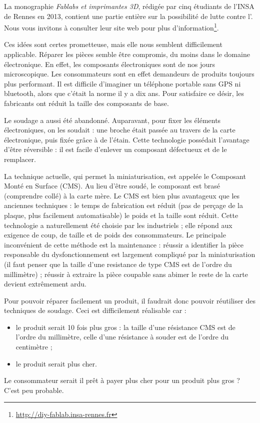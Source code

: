 La monographie \textit{Fablabs et imprimantes 3D}, rédigée par cinq étudiants de l'INSA de Rennes en 2013, contient une partie entière sur la possibilité de lutte contre l'\op. Nous vous invitons à consulter leur site web pour plus d'information\footnote{\url{http://diy-fablab.insa-rennes.fr}}.


\bigbreak 

Ces idées sont certes prometteuse, mais elle nous semblent difficilement applicable. Réparer les pièces semble  être compromis, du moins dans le domaine électronique. En effet, les composants électroniques sont de nos jours microscopique. Les consommateurs sont en effet demandeurs de produits toujours plus performant. Il est difficile d'imaginer un téléphone portable sans GPS ni bluetooth, alors que c'était la norme il y a dix ans. Pour satisfaire ce désir, les fabricants ont réduit la taille des composants de base. 

Le soudage a aussi été abandonné. Auparavant, pour fixer les éléments électroniques, on les soudait : une broche était passée au travers de la carte électronique, puis fixée grâce à de l'étain. Cette technologie possédait l'avantage d'être réversible : il est facile d'enlever un composant défectueux et de le remplacer. 

La technique actuelle, qui permet la miniaturisation, est appelée le Composant Monté en Surface (CMS). Au lieu d'être soudé, le composant est brasé (comprendre collé) à la carte mère. Le CMS est bien plus avantageux que les anciennes techniques : le temps de fabrication est réduit (pas de perçage de la plaque, plus facilement automatisable) le poids et la taille  sont réduit. Cette technologie a naturellement été choisie par les industriels ; elle répond aux exigence de coup, de taille et de poids des consommateurs. Le principale inconvénient de cette méthode est la maintenance : réussir a identifier la pièce responsable du dysfonctionnement est largement compliqué par la miniaturisation (il faut penser que la taille d'une resistance de type CMS est de  l'ordre du millimètre) ; réussir à extraire la pièce coupable sans abimer le reste de la carte devient extrêmement ardu. 

Pour pouvoir  réparer facilement un produit, il faudrait donc pouvoir réutiliser des techniques de soudage. Ceci est difficilement réalisable car : 
\begin{itemize}
\item le produit serait 10 fois plus gros : la taille d'une résistance CMS est de l'ordre du millimètre, celle d'une résistance à souder est de l'ordre du centimètre ;
\item le produit serait plus cher. 
\end{itemize}
Le consommateur serait il prêt à payer plus cher pour un produit plus gros ? C'est peu probable.

